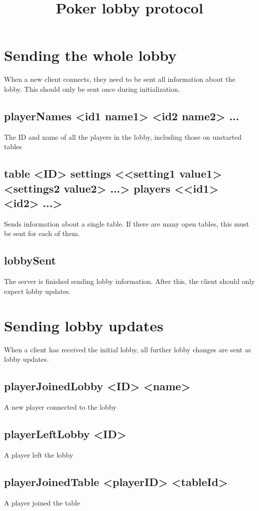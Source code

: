 \documentclass{article}
\title{Poker lobby protocol}
\begin{document}
\maketitle

\section{Sending the whole lobby}
When a new client connects, they need to be sent all information about the lobby. This should only be sent once during initialization.

\subsection*{playerNames <id1 name1> <id2 name2> ...}
The ID and name of all the players in the lobby, including those on unstarted tables

\subsection*{table <ID> settings <{}<setting1 value1> <settings2 value2> ...> players <{}<id1> <id2> ...>}
Sends information about a single table. If there are many open tables, this must be sent for each of them.

\subsection*{lobbySent}
The server is finished sending lobby information. After this, the client should only expect lobby updates.


\section{Sending lobby updates}
When a client has received the initial lobby, all further lobby changes are sent as lobby updates.

\subsection*{playerJoinedLobby <ID> <name>}
A new player connected to the lobby

\subsection*{playerLeftLobby <ID>}
A player left the lobby

\subsection*{playerJoinedTable <playerID> <tableId>}
A player joined the table
\end{document}
